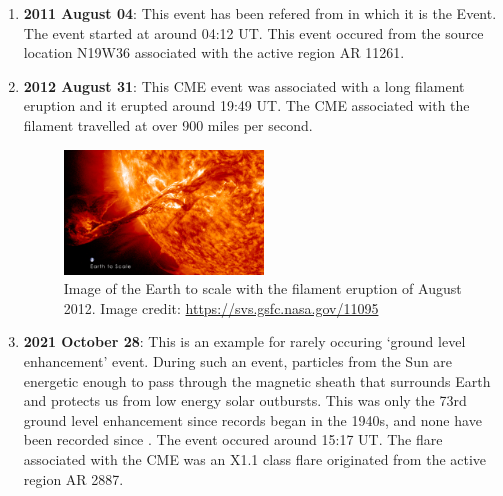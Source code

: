 \begin{enumerate}

        \item\textbf{2011 August 04}: This event has been refered from \citep{Mason2016} in which it is the  Event. The event started at around 04:12 UT. This event occured from the source location N19W36 associated with the active region AR 11261.\\

        \item\textbf{2012 August 31}: This CME event was associated with a long filament eruption and it erupted around 19:49 UT. The CME associated with the filament travelled at over 900 miles per second.\\

    \begin{figure}[h!]
        \centering
        \includegraphics[width=0.5\textwidth]{images/aug_31_2012_event_sun_earth_image.jpg}
        \caption[Image of the Earth to scale of the 2012 August]{Image of the Earth to scale with the filament eruption of  August 2012. Image credit: \url{https://svs.gsfc.nasa.gov/11095}}
        \label{fig:sun_earth_aug_31_2012}
    \end{figure}

        \item\textbf{2021 October 28}: This is an example for rarely occuring `ground level enhancement' event. During such an event, particles from the Sun are energetic enough to pass through the magnetic sheath that surrounds Earth and protects us from low energy solar outbursts. This was only the 73rd ground level enhancement since records began in the 1940s, and none have been recorded since \citep{Klein2022}. The event occured around 15:17 UT. The flare associated with the CME was an X1.1 class flare originated from the active region AR 2887.\\

\end{enumerate}

